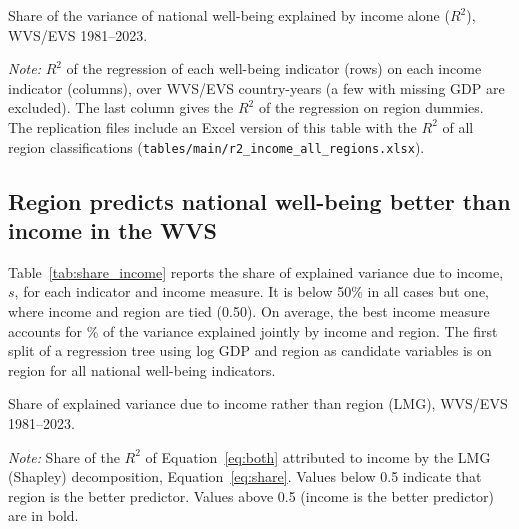 \documentclass[12pt]{article}
\begin{document}
\begin{table}[htbp]
    \centering
    \caption{Share of the variance of national well-being explained by income alone ($R^2$), WVS/EVS 1981--2023.}\label{tab:r2_income}
    \begin{adjustbox}{max width=\textwidth}
    
    \end{adjustbox}
    \begin{minipage}{\textwidth}\footnotesize \textit{Note:} $R^2$ of the regression of each well-being indicator (rows) on each income indicator (columns), over \nWVSCountryYears WVS/EVS country-years (a few with missing GDP are excluded). The last column gives the $R^2$ of the regression on region dummies. The replication files include an Excel version of this table with the $R^2$ of all region classifications (\texttt{tables/main/r2\_income\_all\_regions.xlsx}).\end{minipage}
\end{table}

\subsection{Region predicts national well-being better than income in the WVS}\label{subsec:region_wvs}

Table~\ref{tab:share_income} reports the share of explained variance due to income, $s$, for each indicator and income measure. It is below 50\% in all cases but one, where income and region are tied (0.50). On average, the best income measure accounts for \meanShareIncomeBest\% of the variance explained jointly by income and region. The first split of a regression tree using log GDP and region as candidate variables is on region for all national well-being indicators.

\begin{table}[htbp]
    \centering
    \caption{Share of explained variance due to income rather than region (LMG), WVS/EVS 1981--2023.}\label{tab:share_income}
    \begin{adjustbox}{max width=\textwidth}
    
    \end{adjustbox}
    \begin{minipage}{\textwidth}\footnotesize \textit{Note:} Share of the $R^2$ of Equation~\eqref{eq:both} attributed to income by the LMG (Shapley) decomposition, Equation~\eqref{eq:share}. Values below 0.5 indicate that region is the better predictor. Values above 0.5 (income is the better predictor) are in bold.\end{minipage}
\end{table}
\end{document}
